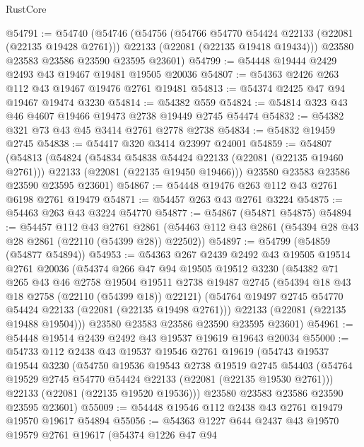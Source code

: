 \begin{lexlean}{RustCore}
\begin{coremodule}
@54791 := @54740
    (@54746
      (@54756
        (@54766 @54770 @54424 @22133 (@22081 (@22135 @19428 @2761)))
        @22133
        (@22081 (@22135 @19418 @19434)))
      @23580
      @23583
      @23586
      @23590
      @23595
      @23601)
@54799 := @54448 @19444 @2429 @2493 @43 @19467 @19481 @19505 @20036
@54807 := @54363 @2426 @263 @112 @43 @19467 @19476 @2761 @19481
@54813 := @54374 @2425 @47 @94 @19467 @19474 @3230
@54814 := @54382 @559
@54824 := @54814 @323 @43 @46 @4607 @19466 @19473 @2738 @19449 @2745 @54474
@54832 := @54382 @321 @73 @43 @45 @3414 @2761 @2778 @2738
@54834 := @54832 @19459 @2745
@54838 := @54417 @320 @3414 @23997 @24001
@54859 := @54807
    (@54813
      (@54824
        (@54834 @54838 @54424 @22133 (@22081 (@22135 @19460 @2761)))
        @22133
        (@22081 (@22135 @19450 @19466)))
      @23580
      @23583
      @23586
      @23590
      @23595
      @23601)
@54867 := @54448 @19476 @263 @112 @43 @2761 @6198 @2761 @19479
@54871 := @54457 @263 @43 @2761 @3224
@54875 := @54463 @263 @43 @3224 @54770
@54877 := @54867 (@54871 @54875)
@54894 := @54457
    @112
    @43
    @2761
    @2861
    (@54463 @112 @43 @2861 (@54394 @28 @43 @28 @2861 (@22110 (@54399 @28)) @22502))
@54897 := @54799 (@54859 (@54877 @54894))
@54953 := @54363
    @267
    @2439
    @2492
    @43
    @19505
    @19514
    @2761
    @20036
    (@54374
      @266
      @47
      @94
      @19505
      @19512
      @3230
      (@54382
        @71
        @265
        @43
        @46
        @2758
        @19504
        @19511
        @2738
        @19487
        @2745
        (@54394 @18 @43 @18 @2758 (@22110 (@54399 @18)) @22121)
        (@54764 @19497 @2745 @54770 @54424 @22133 (@22081 (@22135 @19498 @2761)))
        @22133
        (@22081 (@22135 @19488 @19504)))
      @23580
      @23583
      @23586
      @23590
      @23595
      @23601)
@54961 := @54448 @19514 @2439 @2492 @43 @19537 @19619 @19643 @20034
@55000 := @54733
    @112
    @2438
    @43
    @19537
    @19546
    @2761
    @19619
    (@54743
      @19537
      @19544
      @3230
      (@54750
        @19536
        @19543
        @2738
        @19519
        @2745
        @54403
        (@54764 @19529 @2745 @54770 @54424 @22133 (@22081 (@22135 @19530 @2761)))
        @22133
        (@22081 (@22135 @19520 @19536)))
      @23580
      @23583
      @23586
      @23590
      @23595
      @23601)
@55009 := @54448 @19546 @112 @2438 @43 @2761 @19479 @19570 @19617 @54894
@55056 := @54363
    @1227
    @644
    @2437
    @43
    @19570
    @19579
    @2761
    @19617
    (@54374
      @1226
      @47
      @94

\end{coremodule}
\end{lexlean}
